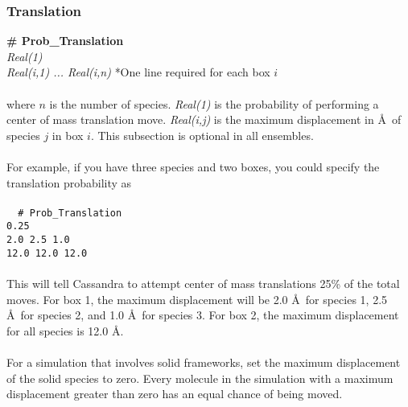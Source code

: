 \subsubsection{Translation}
{\bf \# Prob\_Translation}\\
{\it Real(1)} \\
{\it Real(i,1) ... Real(i,n) } *One line required for each box $i$ \\ \\
%
where $n$ is the number of species.
{\it Real(1)} is the probability of performing a center of mass translation move.
{\it Real(i,j)} is the maximum displacement in \AA\ of species $j$ in box $i$.
This subsection is optional in all ensembles. \\ \\
%
For example, if you have three species and two boxes, you could specify
the translation probability as \\ \\
\texttt{
{ \# Prob\_Translation} \\
 0.25 \\
2.0 2.5 1.0\\
12.0 12.0 12.0}
\\ \\
This will tell Cassandra to attempt center of mass translations 25\%
of the total moves. For box 1, the maximum displacement will be 2.0 \AA\ for
species 1, 2.5 \AA\ for species 2, and 1.0 \AA\ for species 3.
For box 2, the maximum displacement for all species is 12.0 \AA . \\ \\
%
For a simulation that involves solid frameworks,
set the maximum displacement of the solid species to zero.
Every molecule in the simulation with a maximum displacement greater than zero
has an equal chance of being moved.
%
%
%
%
%
%
%
